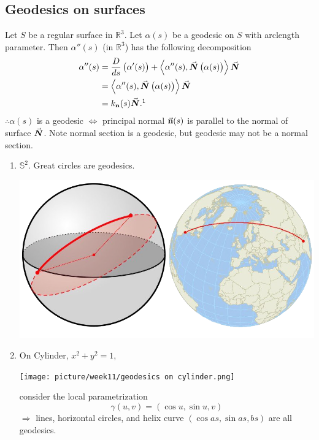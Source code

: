 \subsection{Geodesics on surfaces}
Let \(S\) be a regular surface in \(\mathbb{R}^3\). Let \(\alpha(s)\)
be a geodesic on \(S\) with arclength parameter. Then \(\alpha''(s)\)
(in \(\mathbb{R}^3\)) has the following decomposition
\begin{align*}
    \alpha''(s)&=\frac{D}{ds}\left(\alpha'(s)\right)+
    \left\langle\alpha''(s),\va*{N}\left(\alpha(s)\right)\right\rangle
    \va*{N}\\
    &=\left\langle\alpha''(s),\va*{N}\left(\alpha(s)\right)\right\rangle
    \va*{N}\\
    &=k_{\vb{n}}(s)\va*{N}.\footnotemark
\end{align*}
\(\therefore \alpha(s)\) is a geodesic \(\Longleftrightarrow\) principal
normal \(\va{n}(s)\) is parallel to the normal of surface \(\va*{N}\).
Note normal section is a geodesic, but geodesic may not be a normal
section.
\begin{enumerate}[(1)]
    \item \(\mathbb{S}^2\). Great circles are geodesics.
    \begin{center}
            \includegraphics[scale=0.7]{picture/week11/geodesics on S2.png}
    \end{center}
    \item On Cylinder, \(x^2+y^2=1\), 
    \begin{center}
        \texttt{[image: picture/week11/geodesics on 
        cylinder.png]}
    \end{center}
    consider the local parametrization
    \[\gamma(u,v)=\left(\cos u ,\sin u,v\right)\]
    \(\Rightarrow\) lines, horizontal circles, and helix curve
    \(\left(\cos as,\sin as, bs\right)\) are all geodesics.
\end{enumerate}
